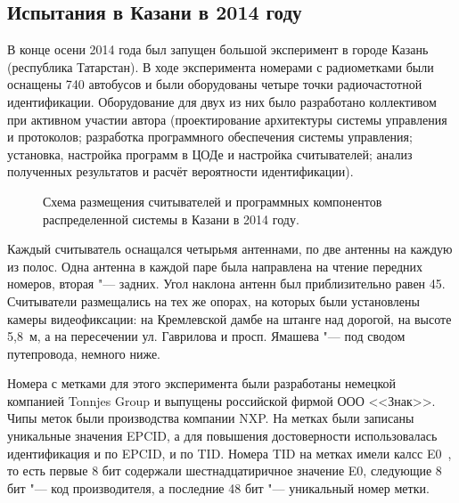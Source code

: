 \subsection{Испытания в Казани в 2014 году}\label{sec:ch5_experiments_kazan2014}

В конце осени 2014 года был запущен большой эксперимент в городе Казань (республика Татарстан). В ходе эксперимента номерами с радиометками были оснащены 740 автобусов и были оборудованы четыре точки радиочастотной идентификации. Оборудование для двух из них было разработано коллективом при активном участии автора (проектирование архитектуры системы управления и протоколов; разработка программного обеспечения системы управления; установка, настройка программ в ЦОДе и настройка считывателей; анализ полученных результатов и расчёт вероятности идентификации).

\begin{figure}[ht]
  \caption{Схема размещения считывателей и программных компонентов распределенной системы в Казани в 2014 году.}
  \label{fig:ch5_kazan2014_schema}
\end{figure}

Каждый считыватель оснащался четырьмя антеннами, по две антенны на каждую из полос. Одна антенна в каждой паре была направлена на чтение передних номеров, вторая "--- задних. Угол наклона антенн был приблизительно равен 45\textdegree. Считыватели размещались на тех же опорах, на которых были установлены камеры видеофиксации: на Кремлевской дамбе на штанге над дорогой, на высоте 5,8~м, а на пересечении ул. Гаврилова и просп. Ямашева "--- под сводом путепровода, немного ниже.

Номера с метками для этого эксперимента были разработаны немецкой компанией Tonnjes Group и выпущены российской фирмой ООО <<Знак>>. Чипы меток были производства компании NXP. На метках были записаны уникальные значения EPCID, а для повышения достоверности использовалась идентификация и по EPCID, и по TID. Номера TID на метках имели калсс E0~\cite{StdGen2}, то есть первые 8 бит содержали шестнадцатиричное значение E0, следующие 8 бит "--- код производителя, а последние 48 бит "--- уникальный номер метки.

